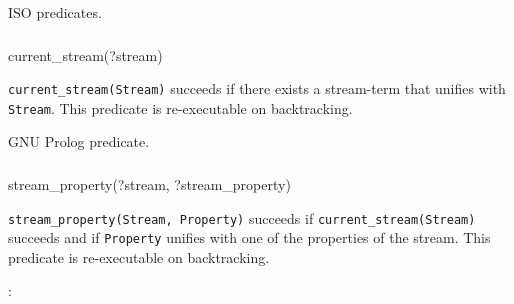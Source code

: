 \Portability

ISO predicates.

\subsubsection{\label{current-stream/1}}

\begin{TemplatesOneCol}
current\_stream(?stream)

\end{TemplatesOneCol}

\Description

\texttt{current\_stream(Stream)} succeeds if there exists
a stream-term that unifies with \texttt{Stream}. This predicate is
re-executable on backtracking.

\begin{PlErrors}


\end{PlErrors}

\Portability

GNU Prolog predicate.

\subsubsection{\label{stream-property/2}}


\begin{TemplatesOneCol}
stream\_property(?stream, ?stream\_property)

\end{TemplatesOneCol}

\Description

\texttt{stream\_property(Stream, Property)} succeeds if
\texttt{current\_stream(Stream)} succeeds  and if
\texttt{Property} unifies with one of the properties of the stream. This
predicate is re-executable on backtracking.

:

